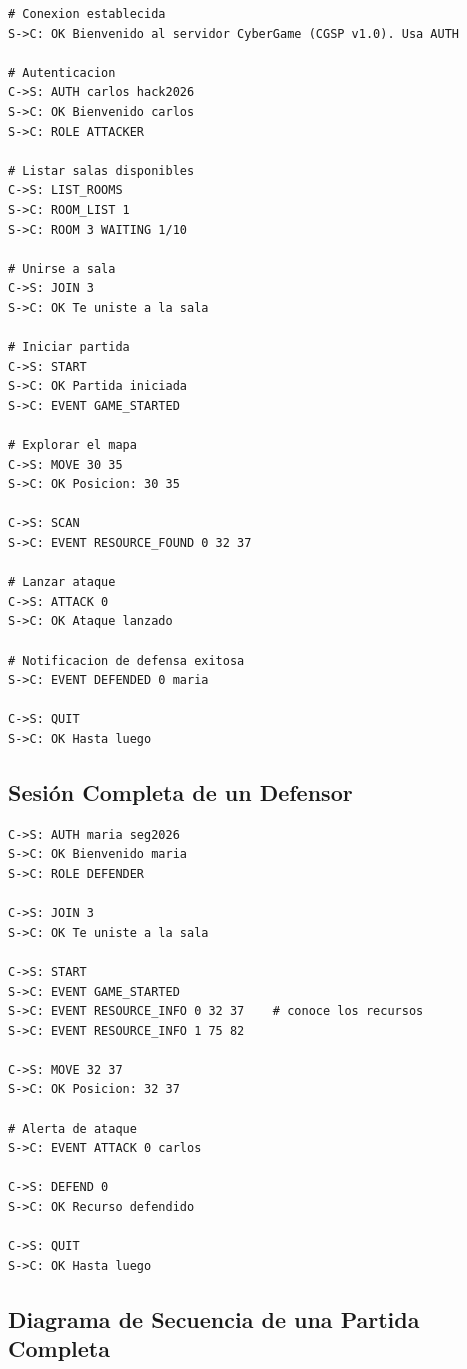 \documentclass[12pt, letterpaper]{article}
\begin{document}
\begin{lstlisting}
# Conexion establecida
S->C: OK Bienvenido al servidor CyberGame (CGSP v1.0). Usa AUTH

# Autenticacion
C->S: AUTH carlos hack2026
S->C: OK Bienvenido carlos
S->C: ROLE ATTACKER

# Listar salas disponibles
C->S: LIST_ROOMS
S->C: ROOM_LIST 1
S->C: ROOM 3 WAITING 1/10

# Unirse a sala
C->S: JOIN 3
S->C: OK Te uniste a la sala

# Iniciar partida
C->S: START
S->C: OK Partida iniciada
S->C: EVENT GAME_STARTED

# Explorar el mapa
C->S: MOVE 30 35
S->C: OK Posicion: 30 35

C->S: SCAN
S->C: EVENT RESOURCE_FOUND 0 32 37

# Lanzar ataque
C->S: ATTACK 0
S->C: OK Ataque lanzado

# Notificacion de defensa exitosa
S->C: EVENT DEFENDED 0 maria

C->S: QUIT
S->C: OK Hasta luego
\end{lstlisting}

\subsection{Sesión Completa de un Defensor}

\begin{lstlisting}
C->S: AUTH maria seg2026
S->C: OK Bienvenido maria
S->C: ROLE DEFENDER

C->S: JOIN 3
S->C: OK Te uniste a la sala

C->S: START
S->C: EVENT GAME_STARTED
S->C: EVENT RESOURCE_INFO 0 32 37    # conoce los recursos
S->C: EVENT RESOURCE_INFO 1 75 82

C->S: MOVE 32 37
S->C: OK Posicion: 32 37

# Alerta de ataque
S->C: EVENT ATTACK 0 carlos

C->S: DEFEND 0
S->C: OK Recurso defendido

C->S: QUIT
S->C: OK Hasta luego
\end{lstlisting}

\subsection{Diagrama de Secuencia de una Partida Completa}
\end{document}
